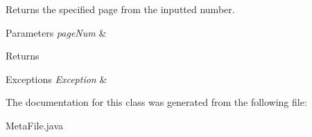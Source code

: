 Returns the specified page from the inputted number. 
\begin{DoxyParams}{Parameters}
{\em page\+Num} & \\
\hline
\end{DoxyParams}
\begin{DoxyReturn}{Returns}

\end{DoxyReturn}

\begin{DoxyExceptions}{Exceptions}
{\em Exception} & \\
\hline
\end{DoxyExceptions}


The documentation for this class was generated from the following file\+:\begin{DoxyCompactItemize}
\item 
Meta\+File.\+java\end{DoxyCompactItemize}
